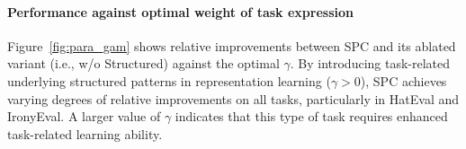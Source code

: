 \documentclass[letterpaper]{article} %
\begin{document}
\paragraph{Performance against optimal weight of task expression}
Figure~\ref{fig:para_gam} shows relative improvements between SPC and its ablated variant (i.e., w/o Structured) against the optimal $\gamma$. By introducing task-related underlying structured patterns in representation learning ($\gamma>0$), SPC achieves varying degrees of relative improvements on all tasks, particularly in HatEval and IronyEval. A larger value of $\gamma$ indicates that this type of task requires enhanced task-related learning ability.
\end{document}
